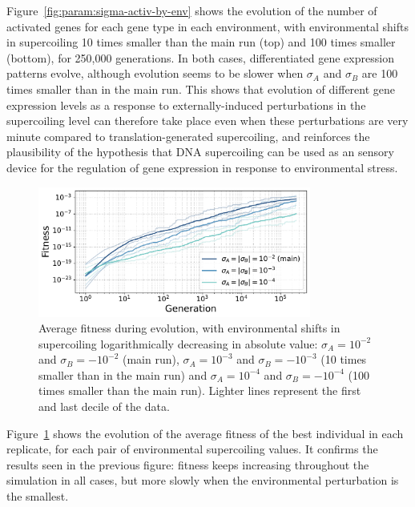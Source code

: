 Figure~\ref{fig:param:sigma-activ-by-env} shows the evolution of the number of activated genes for each gene type in each environment, with environmental shifts in supercoiling 10 times smaller than the main run (top) and 100 times smaller (bottom), for 250,000 generations.
In both cases, differentiated gene expression patterns evolve, although evolution seems to be slower when $\sigma_A$ and $\sigma_B$ are 100 times smaller than in the main run.
This shows that evolution of different gene expression levels as a response to externally-induced perturbations in the supercoiling level can therefore take place even when these perturbations are very minute compared to translation-generated supercoiling, and reinforces the plausibility of the hypothesis that DNA supercoiling can be used as an sensory device for the regulation of gene expression in response to environmental stress.

\begin{figure}[H]
\centering
\includegraphics[width=0.8\textwidth]{param/sigma/fitness_all_with_main.pdf}
\caption[Average fitness during evolution, with decreasing environmental supercoiling shifts]{Average fitness during evolution, with environmental shifts in supercoiling logarithmically decreasing in absolute value: $\sigma_A = 10^{-2}$ and $\sigma_B = -10^{-2}$ (main run), $\sigma_A = 10^{-3}$ and $\sigma_B = -10^{-3}$ (10 times smaller than in the main run) and $\sigma_A = 10^{-4}$ and $\sigma_B = -10^{-4}$ (100 times smaller than the main run).
Lighter lines represent the first and last decile of the data.}
\label{fig:param:sigma-fitness}
\end{figure}

Figure~\ref{fig:param:sigma-fitness} shows the evolution of the average fitness of the best individual in each replicate, for each pair of environmental supercoiling values.
It confirms the results seen in the previous figure: fitness keeps increasing throughout the simulation in all cases, but more slowly when the environmental perturbation is the smallest.

